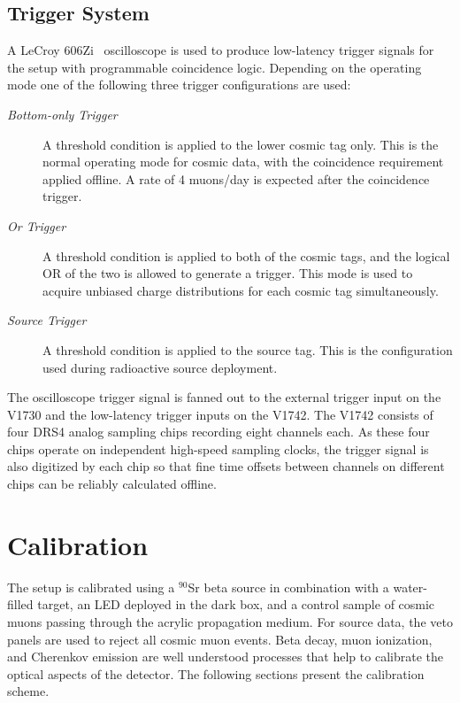 \subsection{Trigger System}
\label{sec:triggering}

A LeCroy 606Zi~\cite{lecroy606zi} oscilloscope is used to produce low-latency trigger signals for the setup with programmable coincidence logic. 
Depending on the operating mode one of the following three trigger configurations are used:
\begin{description}
\item [\rm\it Bottom-only Trigger] A threshold condition is applied to the lower cosmic tag only. 
This is the normal operating mode for cosmic data, with the coincidence requirement applied offline.  
A rate of 4 muons/day is expected after the coincidence trigger.
\item [\rm\it Or Trigger] A threshold condition is applied to both of the cosmic tags, and the logical OR of the two is allowed to generate a trigger. 
This mode is used to acquire unbiased charge distributions for each cosmic tag simultaneously.
\item [\rm\it Source Trigger] A threshold condition is applied to the source tag. 
This is the configuration used during radioactive source deployment.
\end{description}
The oscilloscope trigger signal is fanned out to the external trigger input on the V1730 and the low-latency trigger inputs on the V1742.
The V1742 consists of four DRS4 analog sampling chips recording eight channels each.
As these four chips operate on independent high-speed sampling clocks, the trigger signal is also digitized by each chip so that fine time offsets between channels on different chips can be reliably calculated offline.  

\section{Calibration}
\label{sec:calibration}

The setup is calibrated using a $^{90}$Sr beta source in combination with a water-filled target, an LED deployed in the dark box, and a control sample of cosmic muons passing through the acrylic propagation medium. 
For source data, the veto panels are used to reject all cosmic muon events. 
Beta decay, muon ionization, and Cherenkov emission are well understood processes that help to calibrate the optical aspects of the detector. 
The following sections present the calibration scheme.

